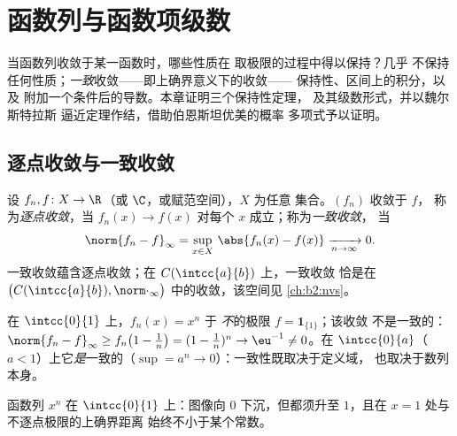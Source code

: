 \chapter{函数列与函数项级数}\label{ch:b2:funcseq}

当函数列收敛于某一函数时，哪些性质在
取极限的过程中得以保持？几乎
不保持任何性质；\emph{一致}收敛——即上确界意义下的收敛——
保持性、区间上的积分，以及
附加一个条件后的导数。本章证明三个保持性定理，
及其级数形式，并以魏尔斯特拉斯
逼近定理作结，借助伯恩斯坦优美的概率
多项式予以证明。

\section{逐点收敛与一致收敛}

\begin{definition}\label{def:b2:funcseq:def}
设 $f_n, f \colon X \to \R$（或 $\C$，或赋范空间），$X$ 为任意
集合。$(f_n)$ 收敛于 $f$，
称为\emph{逐点收敛}，当 $f_n(x) \to
f(x)$ 对每个 $x$ 成立；称为\emph{一致收敛}，
当
\[
\norm{f_n - f}_\infty = \sup_{x \in X}\, \abs{f_n(x) - f(x)}
\xrightarrow[n \to \infty]{} 0 .
\]
一致收敛蕴含逐点收敛；在 $C(\intcc{a}{b})$ 上，一致收敛
恰是在
$\bigl(C(\intcc{a}{b}), \norm\cdot_\infty\bigr)$ 中的收敛，该空间见
\cref{ch:b2:nvs}。
\end{definition}

\begin{example}\label{ex:b2:funcseq:xn}
在 $\intcc{0}{1}$ 上，$f_n(x) = x^n$ 于
\emph{不}的极限 $f = \mathbf{1}_{\{1\}}$；该收敛
不是一致的：$\norm{f_n - f}_\infty \geq f_n\bigl(1 -
\tfrac1n\bigr) = (1 - \tfrac1n)^n \to \eu^{-1} \neq 0$。在
$\intcc{0}{a}$（$a < 1$）上它\emph{是}一致的（$\sup = a^n \to
0$）：一致性既取决于定义域，
也取决于数列本身。
\end{example}

\begin{omfigure}

{\small 函数列 $x^n$ 在 $\intcc{0}{1}$ 上：图像向
$0$ 下沉，但都须升至 $1$，且在 $x = 1$ 处与不逐点极限的上确界距离
始终不小于某个常数。}
\end{omfigure}

